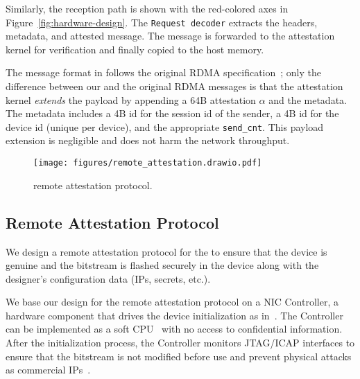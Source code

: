 Similarly, the reception path is shown with the red-colored axes in Figure~\ref{fig:hardware-design}. The {\tt Request decoder} extracts the headers, metadata, and attested message. The message is forwarded to the attestation kernel for verification and finally copied to the host memory.

The message format in \projecttitle{} follows the original RDMA specification~\cite{rdma_specification}; only the difference between our \projecttitle{} and the original RDMA messages is that the attestation kernel {\em extends} the payload by appending a 64B attestation $\alpha$ and the metadata. The metadata includes a 4B id for the session id of the sender, a 4B id for the device id (unique per device), and the appropriate {\tt send\_cnt}. This payload extension is negligible and does not harm the network throughput.  

\begin{figure}[t!]
    \centering
    \texttt{[image: figures/remote\_attestation.drawio.pdf]}
    \caption{\projecttitle{} remote attestation protocol.}
    \label{fig:remote_attestation}
\end{figure}

\subsection{Remote Attestation Protocol} 
\label{subsec:nic_controller}
We design a remote attestation protocol for the \projecttitle{} to ensure that the \projecttitle{} device is genuine and the \projecttitle{} bitstream is flashed securely in the device along with the designer's configuration data (IPs, secrets, etc.).

 We base our design for the remote attestation protocol on a NIC Controller, a hardware component that drives the device initialization as in~\cite{10.1145/3503222.3507733}. The Controller can be implemented as a soft CPU~\cite{microblaze, nios, 10.1145/3503222.3507733} with no access to confidential information. After the initialization process, the Controller monitors JTAG/ICAP interfaces to ensure that the bitstream is not modified before use and prevent physical attacks as commercial IPs~\cite{secMon}.

